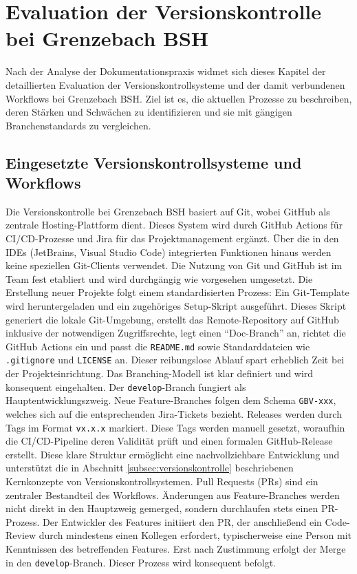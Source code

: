 \documentclass[12pt,oneside]{article}
\begin{document}


    \section{Evaluation der Versionskontrolle bei Grenzebach BSH}
    \label{sec:evaluation_versionskontrolle}
    Nach der Analyse der Dokumentationspraxis widmet sich dieses Kapitel der detaillierten Evaluation der Versionskontrollsysteme und der damit verbundenen Workflows bei Grenzebach BSH. Ziel ist es, die aktuellen Prozesse zu beschreiben, deren Stärken und Schwächen zu identifizieren und sie mit gängigen Branchenstandards zu vergleichen.

    \subsection{Eingesetzte Versionskontrollsysteme und Workflows}
    \label{subsec:vk_systeme}
    Die Versionskontrolle bei Grenzebach BSH basiert auf Git, wobei GitHub als zentrale Hosting-Plattform dient. Dieses System wird durch GitHub Actions für CI/CD-Prozesse und Jira für das Projektmanagement ergänzt. Über die in den IDEs (JetBrains, Visual Studio Code) integrierten Funktionen hinaus werden keine speziellen Git-Clients verwendet. Die Nutzung von Git und GitHub ist im Team fest etabliert und wird durchgängig wie vorgesehen umgesetzt.
    \newline
    Die Erstellung neuer Projekte folgt einem standardisierten Prozess: Ein Git-Template wird heruntergeladen und ein zugehöriges Setup-Skript ausgeführt. Dieses Skript generiert die lokale Git-Umgebung, erstellt das Remote-Repository auf GitHub inklusive der notwendigen Zugriffsrechte, legt einen ``Doc-Branch'' an, richtet die GitHub Actions ein und passt die \texttt{README.md} sowie Standarddateien wie \texttt{.gitignore} und \texttt{LICENSE} an. Dieser reibungslose Ablauf spart erheblich Zeit bei der Projekteinrichtung.
    \newline
    Das Branching-Modell ist klar definiert und wird konsequent eingehalten. Der \texttt{develop}-Branch fungiert als Hauptentwicklungszweig. Neue Feature-Branches folgen dem Schema \texttt{GBV-xxx}, welches sich auf die entsprechenden Jira-Tickets bezieht. Releases werden durch Tags im Format \texttt{vx.x.x} markiert. Diese Tags werden manuell gesetzt, woraufhin die CI/CD-Pipeline deren Validität prüft und einen formalen GitHub-Release erstellt. Diese klare Struktur ermöglicht eine nachvollziehbare Entwicklung und unterstützt die in Abschnitt \ref{subsec:versionskontrolle} beschriebenen Kernkonzepte von Versionskontrollsystemen.
    \newline
    Pull Requests (PRs) sind ein zentraler Bestandteil des Workflows. Änderungen aus Feature-Branches werden nicht direkt in den Hauptzweig gemerged, sondern durchlaufen stets einen PR-Prozess. Der Entwickler des Features initiiert den PR, der anschließend ein Code-Review durch mindestens einen Kollegen erfordert, typischerweise eine Person mit Kenntnissen des betreffenden Features. Erst nach Zustimmung erfolgt der Merge in den \texttt{develop}-Branch. Dieser Prozess wird konsequent befolgt.
\end{document}
